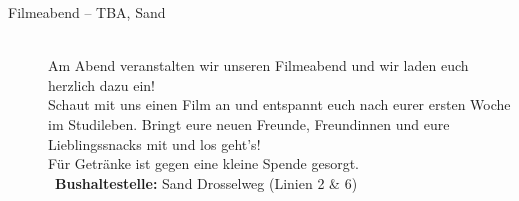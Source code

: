 \begin{description}
\ifml
\else
	\item[Filmeabend -- TBA, Sand]~\\
	Am Abend veranstalten wir unseren Filmeabend und wir laden euch herzlich dazu ein!\\
	Schaut mit uns einen Film an und entspannt euch nach eurer ersten Woche im Studileben.
	Bringt eure neuen Freunde, Freundinnen und eure Lieblingssnacks mit und los geht's!\\
	Für Getränke ist gegen eine kleine Spende gesorgt.\\
	~\textbf{Bushaltestelle:} Sand Drosselweg (Linien 2 \& 6)
\fi



\end{description}
